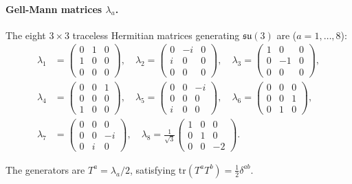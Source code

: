 \paragraph{Gell-Mann matrices $\lambda_a$.} The eight $3\times 3$ traceless Hermitian matrices generating $\mathfrak{su}(3)$ are ($a=1,\ldots,8$):
\begin{align}
\lambda_1 &= \begin{pmatrix} 0 & 1 & 0 \\ 1 & 0 & 0 \\ 0 & 0 & 0 \end{pmatrix}, \quad
\lambda_2 = \begin{pmatrix} 0 & -i & 0 \\ i & 0 & 0 \\ 0 & 0 & 0 \end{pmatrix}, \quad
\lambda_3 = \begin{pmatrix} 1 & 0 & 0 \\ 0 & -1 & 0 \\ 0 & 0 & 0 \end{pmatrix}, \nonumber \\
\lambda_4 &= \begin{pmatrix} 0 & 0 & 1 \\ 0 & 0 & 0 \\ 1 & 0 & 0 \end{pmatrix}, \quad
\lambda_5 = \begin{pmatrix} 0 & 0 & -i \\ 0 & 0 & 0 \\ i & 0 & 0 \end{pmatrix}, \quad
\lambda_6 = \begin{pmatrix} 0 & 0 & 0 \\ 0 & 0 & 1 \\ 0 & 1 & 0 \end{pmatrix}, \nonumber \\
\lambda_7 &= \begin{pmatrix} 0 & 0 & 0 \\ 0 & 0 & -i \\ 0 & i & 0 \end{pmatrix}, \quad
\lambda_8 = \frac{1}{\sqrt{3}} \begin{pmatrix} 1 & 0 & 0 \\ 0 & 1 & 0 \\ 0 & 0 & -2 \end{pmatrix}.
\label{eq:gellmann-matrices}
\end{align}

The generators are $T^a = \lambda_a/2$, satisfying $\mathrm{tr}(T^a T^b) = \frac{1}{2}\delta^{ab}$.

